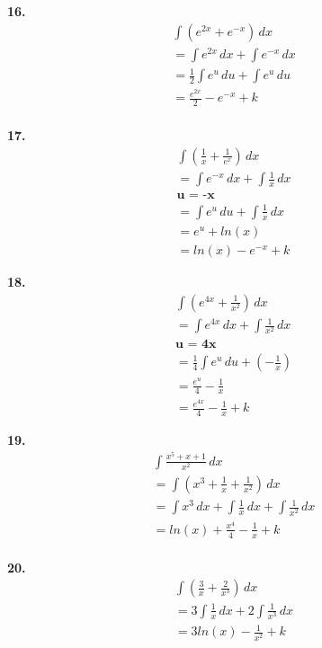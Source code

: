 \documentclass{article}
\begin{document}
\textbf{16.}
\begin{gather*}
    \int (e^{2x} + e^{-x})\,dx
\\
    = \int e^{2x}\,dx + \int e^{-x}\,dx
\\
    = \frac{1}{2} \int e^u\,du + \int e^u\,du
\\ 
    = \frac{e^{2x}}{2} - e^{-x} + k
\\
\end{gather*}

\textbf{17.}
\begin{gather*}
    \int (\frac{1}{x} + \frac{1}{e^x})\,dx
\\
    = \int e^{-x} \,dx + \int \frac{1}{x}\,dx
\\
    \textbf{u = -x}
\\ 
    = \int e^{u} \,du + \int \frac{1}{x}\,dx
\\
    = e^u + ln(x)
\\ 
    = ln(x) - e^{-x} + k
\end{gather*}

\textbf{18.}
\begin{gather*}
    \int (e^{4x} + \frac{1}{x^2})\,dx
\\
    = \int e^{4x} \,dx + \int \frac{1}{x^2}\,dx
\\
    \textbf{u = 4x}
\\ 
    = \frac{1}{4}\int e^u\,du + (-\frac{1}{x})
\\
    = \frac{e^u}{4} - \frac{1}{x}
\\ 
    = \frac{e^{4x}}{4} - \frac{1}{x} + k
\end{gather*}

\textbf{19.}
\begin{gather*}
    \int \frac{x^5+x+1}{x^2}\,dx
\\
    = \int (x^3 + \frac{1}{x} + \frac{1}{x^2}) \,dx
\\
    = \int x^3\,dx + \int \frac{1}{x}\,dx + \int \frac{1}{x^2}\,dx
\\ 
    = ln(x) + \frac{x^4}{4} - \frac{1}{x} + k
\\
\end{gather*}

\textbf{20.}
\begin{gather*}
    \int (\frac{3}{x} + \frac{2}{x^3})\,dx
\\
    = 3\int \frac{1}{x}\,dx + 2\int \frac{1}{x^3}\,dx
\\
    = 3ln(x) - \frac{1}{x^2} + k
\\
\end{gather*}
\end{document}
